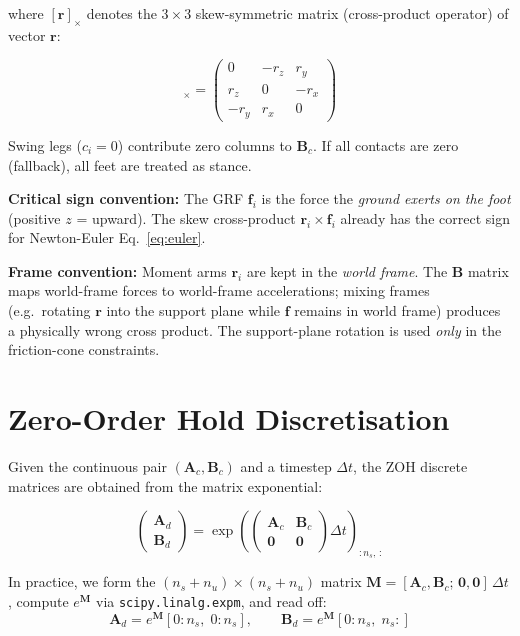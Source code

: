 \documentclass[12pt,a4paper]{report}
\newcommand{\vect}[1]{\bm{#1}}
\newcommand{\mat}[1]{\mathbf{#1}}
\newcommand{\skew}[1]{[#1]_{\times}}
\begin{document}
where $\skew{\vect{r}}$ denotes the $3\times3$ skew-symmetric matrix
(cross-product operator) of vector $\vect{r}$:

\begin{equation}
    \skew{\vect{r}} =
    \begin{pmatrix}
        0 & -r_z & r_y \\
        r_z & 0 & -r_x \\
        -r_y & r_x & 0
    \end{pmatrix}
\end{equation}

Swing legs ($c_i = 0$) contribute zero columns to $\mat{B}_c$.
If all contacts are zero (fallback), all feet are treated as stance.

\textbf{Critical sign convention:} The GRF $\vect{f}_i$ is the force the
\emph{ground exerts on the foot} (positive $z$ = upward).  The skew
cross-product $\vect{r}_i \times \vect{f}_i$ already has the correct sign for
Newton-Euler Eq.~\eqref{eq:euler}.

\textbf{Frame convention:} Moment arms $\vect{r}_i$ are kept in the
\emph{world frame}.  The $\mat{B}$ matrix maps world-frame forces to
world-frame accelerations; mixing frames (e.g.\ rotating $\vect{r}$ into the
support plane while $\vect{f}$ remains in world frame) produces a physically
wrong cross product.  The support-plane rotation is used \emph{only} in the
friction-cone constraints.

\section{Zero-Order Hold Discretisation}

Given the continuous pair $(\mat{A}_c, \mat{B}_c)$ and a timestep $\Delta t$,
the ZOH discrete matrices are obtained from the matrix exponential:

\begin{equation}
    \begin{pmatrix}\mat{A}_d \\ \mat{B}_d\end{pmatrix}
    = \exp\!\left(
        \begin{pmatrix} \mat{A}_c & \mat{B}_c \\ \mat{0} & \mat{0} \end{pmatrix}
        \Delta t
    \right)_{:n_s,\,:}
    \label{eq:zoh}
\end{equation}

In practice, we form the $(n_s + n_u)\times(n_s + n_u)$ matrix
$\mat{M} = [\mat{A}_c, \mat{B}_c;\, \mat{0}, \mat{0}]\,\Delta t$,
compute $e^{\mat{M}}$ via \texttt{scipy.linalg.expm}, and read off:
\begin{equation}
    \mat{A}_d = e^{\mat{M}}[0\!:\!n_s,\; 0\!:\!n_s], \qquad
    \mat{B}_d = e^{\mat{M}}[0\!:\!n_s,\; n_s\!:]
\end{equation}
\end{document}
